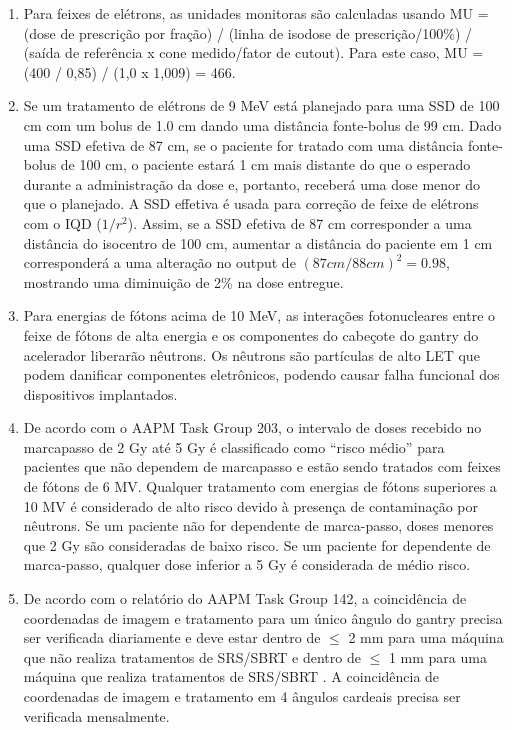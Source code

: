 \documentclass[11pt,a4paper]{article}
\begin{document}
\begin{enumerate}
        \item Para feixes de elétrons, as unidades monitoras são calculadas usando MU = (dose de prescrição por fração) / (linha de isodose de prescrição/100\%) / (saída de referência x cone medido/fator de cutout). Para este caso, MU = (400 / 0,85) / (1,0 x 1,009) = 466.

        \item Se um tratamento de elétrons de 9 MeV está planejado para uma SSD de 100 cm com um bolus de 1.0 cm dando uma distância fonte-bolus de 99 cm. Dado uma SSD efetiva de 87 cm, se o paciente for tratado com uma distância fonte-bolus de 100 cm, o paciente estará 1 cm mais distante do que o esperado durante a administração da dose e, portanto, receberá uma dose menor do que o planejado. A SSD effetiva é usada para correção de feixe de elétrons com o IQD ($1/r^2$). Assim, se a SSD efetiva de 87 cm corresponder a uma distância do isocentro de 100 cm, aumentar a distância do paciente em 1 cm corresponderá a uma alteração no output de $(87 cm / 88 cm)^2 = 0.98$, mostrando uma diminuição de 2\% na dose entregue.

        \item Para energias de fótons acima de 10 MeV, as interações fotonucleares entre o feixe de fótons de alta energia e os componentes do cabeçote do gantry do acelerador liberarão nêutrons. Os nêutrons são partículas de alto LET que podem danificar componentes eletrônicos, podendo causar falha funcional dos dispositivos implantados.

        \item De acordo com o AAPM Task Group 203, o intervalo de doses recebido no marcapasso de 2 Gy até 5 Gy é classificado como “risco médio” para pacientes que não dependem de marcapasso e estão sendo tratados com feixes de fótons de 6 MV. Qualquer tratamento com energias de fótons superiores a 10 MV é considerado de alto risco devido à presença de contaminação por nêutrons. Se um paciente não for dependente de marca-passo, doses menores que 2 Gy são consideradas de baixo risco. Se um paciente for dependente de marca-passo, qualquer dose inferior a 5 Gy é considerada de médio risco.

        \item De acordo com o relatório do AAPM Task Group 142, a coincidência de coordenadas de imagem e tratamento para um único ângulo do gantry precisa ser verificada diariamente e deve estar dentro de $\leq$ 2 mm para uma máquina que não realiza tratamentos de SRS/SBRT e dentro de $\leq$ 1 mm para uma máquina que realiza tratamentos de SRS/SBRT . A coincidência de coordenadas de imagem e tratamento em 4 ângulos cardeais precisa ser verificada mensalmente.


\end{enumerate}
\end{document}
